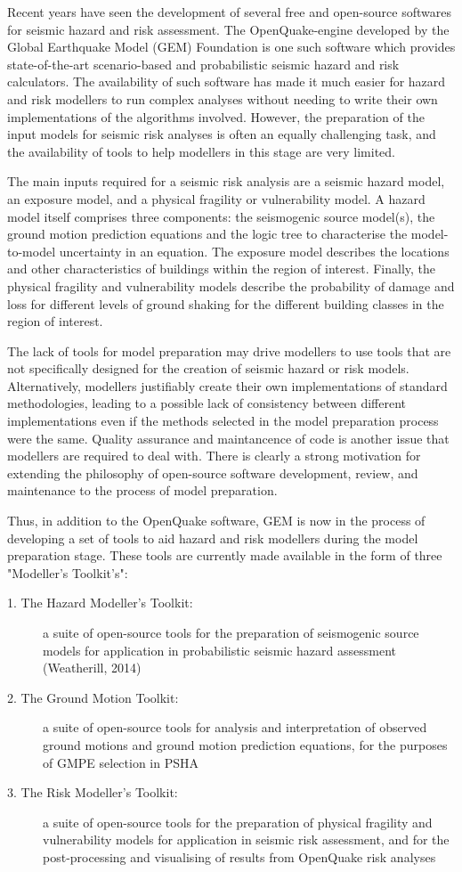 Recent years have seen the development of several free and open-source softwares for seismic hazard and risk assessment. The OpenQuake-engine developed by the Global Earthquake Model (GEM) Foundation is one such software which provides state-of-the-art scenario-based and probabilistic seismic hazard and risk calculators. The availability of such software has made it much easier for hazard and risk modellers to run complex analyses without needing to write their own implementations of the algorithms involved. However, the preparation of the input models for seismic risk analyses is often an equally challenging task, and the availability of tools to help modellers in this stage are very limited.

The main inputs required for a seismic risk analysis are a seismic hazard model, an exposure model, and a physical fragility or vulnerability model. A hazard model itself comprises three components: the seismogenic source model(s), the ground motion prediction equations and the logic tree to characterise the model-to-model uncertainty in an equation. The exposure model describes the locations and other characteristics of buildings within the region of interest. Finally, the physical fragility and vulnerability models describe the probability of damage and loss for different levels of ground shaking for the different building classes in the region of interest.

The lack of tools for model preparation may drive modellers to use tools that are not specifically designed for the creation of seismic hazard or risk models. Alternatively, modellers justifiably create their own implementations of standard methodologies, leading to a possible lack of consistency between different implementations even if the methods selected in the model preparation process were the same. Quality assurance and maintancence of code is another issue that modellers are required to deal with. There is clearly a strong motivation for extending the philosophy of open-source software development, review, and maintenance to the process of model preparation.

Thus, in addition to the OpenQuake software, GEM is now in the process of developing a set of tools to aid hazard and risk modellers during the model preparation stage. These tools are currently made available in the form of three "Modeller’s Toolkit’s":
\begin{description}
\item[1. The Hazard Modeller’s Toolkit:] a suite of open-source tools for the preparation of seismogenic source models for application in probabilistic seismic hazard assessment (Weatherill, 2014)
\item[2. The Ground Motion Toolkit:] a suite of open-source tools for analysis and interpretation of observed ground motions and ground motion prediction equations, for the purposes of GMPE selection in PSHA
\item[3. The Risk Modeller's Toolkit:] a suite of open-source tools for the preparation of physical fragility and vulnerability models for application in seismic risk assessment, and for the post-processing and visualising of results from OpenQuake risk analyses
\end{description}

